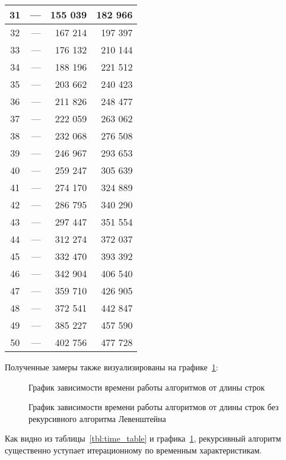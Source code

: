 \begin{longtable}[]{|c|r|r|r|}
31 & --- & 155 039& 182 966 \\ \hline
32 & --- & 167 214& 197 397 \\ \hline
33 & --- & 176 132& 210 144 \\ \hline
34 & --- & 188 196& 221 512 \\ \hline
35 & --- & 203 662& 240 423 \\ \hline
36 & --- & 211 826& 248 477 \\ \hline
37 & --- & 222 059& 263 062 \\ \hline
38 & --- & 232 068& 276 508 \\ \hline
39 & --- & 246 967& 293 653 \\ \hline
40 & --- & 259 247& 305 639 \\ \hline
41 & --- & 274 170& 324 889 \\ \hline
42 & --- & 286 795& 340 290 \\ \hline
43 & --- & 297 447& 351 554 \\ \hline
44 & --- & 312 274& 372 037 \\ \hline
45 & --- & 332 470& 393 392 \\ \hline
46 & --- & 342 904& 406 540 \\ \hline
47 & --- & 359 710& 426 905 \\ \hline
48 & --- & 372 541& 442 847 \\ \hline
49 & --- & 385 227& 457 590 \\ \hline
50 & --- & 402 756& 477 728 \\ \hline
\end{longtable}


Полученные замеры также визуализированы на графике~\ref{fig:time_graph}:

\begin{figure}[h!]
	\centering
    
	\caption{График зависимости времени работы алгоритмов от длины строк}
	\label{fig:time_graph}
\end{figure}

\begin{figure}[h!]
	\centering
    
	\caption{График зависимости времени работы алгоритмов от длины строк без рекурсивного алгоритма Левенштейна}
	\label{fig:time_graph_norec}
\end{figure}

Как видно из таблицы~\ref{tbl:time_table} и графика~\ref{fig:time_graph}, рекурсивный алгоритм существенно уступает итерационному по временным характеристикам.

